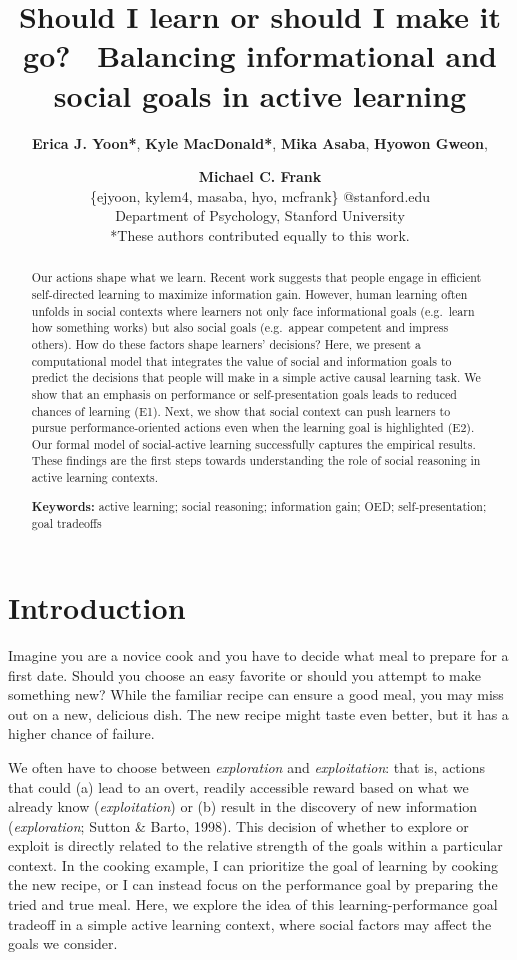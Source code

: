 \documentclass[10pt, letterpaper]{article}
\title{Should I learn or should I make it go? ~Balancing informational and
social goals in active learning}
\author{{\large \bf Erica J. Yoon*}, {\large \bf Kyle MacDonald*}, {\large \bf Mika Asaba}, {\large \bf Hyowon Gweon}, \and {\large \bf Michael C. Frank} \\ \{ejyoon, kylem4, masaba, hyo, mcfrank\} @stanford.edu \\ Department of Psychology, Stanford University \\ *These authors contributed equally to this work.}
\begin{document}
\maketitle

\begin{abstract}
Our actions shape what we learn. Recent work suggests that people engage
in efficient self-directed learning to maximize information gain.
However, human learning often unfolds in social contexts where learners
not only face informational goals (e.g.~learn how something works) but
also social goals (e.g.~appear competent and impress others). How do
these factors shape learners' decisions? Here, we present a
computational model that integrates the value of social and information
goals to predict the decisions that people will make in a simple active
causal learning task. We show that an emphasis on performance or
self-presentation goals leads to reduced chances of learning (E1). Next,
we show that social context can push learners to pursue
performance-oriented actions even when the learning goal is highlighted
(E2). Our formal model of social-active learning successfully captures
the empirical results. These findings are the first steps towards
understanding the role of social reasoning in active learning contexts.

\textbf{Keywords:}
active learning; social reasoning; information gain; OED;
self-presentation; goal tradeoffs
\end{abstract}

\section{Introduction}\label{introduction}

Imagine you are a novice cook and you have to decide what meal to
prepare for a first date. Should you choose an easy favorite or should
you attempt to make something new? While the familiar recipe can ensure
a good meal, you may miss out on a new, delicious dish. The new recipe
might taste even better, but it has a higher chance of failure.

We often have to choose between \emph{exploration} and
\emph{exploitation}: that is, actions that could (a) lead to an overt,
readily accessible reward based on what we already know
(\emph{exploitation}) or (b) result in the discovery of new information
(\emph{exploration}; Sutton \& Barto, 1998). This decision of whether to
explore or exploit is directly related to the relative strength of the
goals within a particular context. In the cooking example, I can
prioritize the goal of learning by cooking the new recipe, or I can
instead focus on the performance goal by preparing the tried and true
meal. Here, we explore the idea of this learning-performance goal
tradeoff in a simple active learning context, where social factors may
affect the goals we consider.
\end{document}
